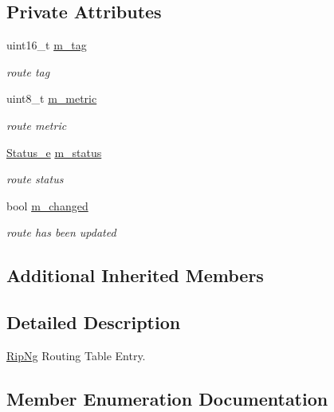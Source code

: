 \subsection*{Private Attributes}
\begin{DoxyCompactItemize}
\item 
uint16\+\_\+t \hyperlink{classns3_1_1RipNgRoutingTableEntry_a7847d5c3a75d51734422ae04a7334b4b}{m\+\_\+tag}
\begin{DoxyCompactList}\small\item\em route tag \end{DoxyCompactList}\item 
uint8\+\_\+t \hyperlink{classns3_1_1RipNgRoutingTableEntry_ab481ccf8df99dc0dcc819a5d07538ee1}{m\+\_\+metric}
\begin{DoxyCompactList}\small\item\em route metric \end{DoxyCompactList}\item 
\hyperlink{classns3_1_1RipNgRoutingTableEntry_af723fc23e97afdd05c55da5162b7e673}{Status\+\_\+e} \hyperlink{classns3_1_1RipNgRoutingTableEntry_ac8fd0bb518d91ae1369d51ce47497159}{m\+\_\+status}
\begin{DoxyCompactList}\small\item\em route status \end{DoxyCompactList}\item 
bool \hyperlink{classns3_1_1RipNgRoutingTableEntry_a6b3773babc90843f6fd88acea68c3430}{m\+\_\+changed}
\begin{DoxyCompactList}\small\item\em route has been updated \end{DoxyCompactList}\end{DoxyCompactItemize}
\subsection*{Additional Inherited Members}


\subsection{Detailed Description}
\hyperlink{classns3_1_1RipNg}{Rip\+Ng} Routing Table Entry. 

\subsection{Member Enumeration Documentation}
